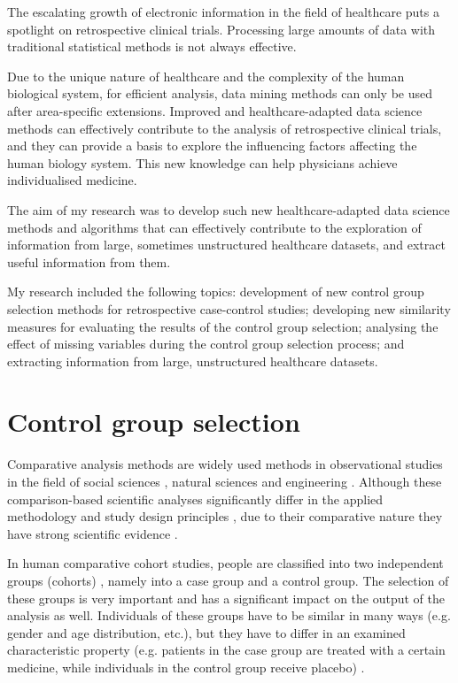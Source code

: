The escalating growth of electronic information in the field of healthcare puts a spotlight on retrospective clinical trials. Processing large amounts of data with traditional statistical methods is not always effective.


Due to the unique nature of healthcare and the complexity of the human biological system, for efficient analysis, data mining methods can only be used after area-specific extensions. Improved and healthcare-adapted data science methods can effectively contribute to the analysis of retrospective clinical trials, and they can provide a basis to explore the influencing factors affecting the human biology system. This new knowledge can help physicians achieve individualised medicine.

The aim of my research was to develop such new healthcare-adapted data science methods and algorithms that can effectively contribute to the exploration of information from large, sometimes unstructured healthcare datasets, and extract useful information from them.

My research included the following topics: development of new control group selection methods for retrospective case-control studies; developing new similarity measures for evaluating the results of the control group selection; analysing the effect of missing variables during the control group selection process; and extracting information from large, unstructured healthcare datasets.

\section{Control group selection}
\label{sec:cgs_intro}

Comparative analysis methods are widely used methods in observational studies in the field of social sciences \cite{rasoolimanesh2023guideline}, natural sciences \cite{zeng2023comparative} and engineering \cite{abualigah2022meta}. Although these comparison-based scientific analyses significantly differ in the applied methodology and study design principles \cite{song2010observational, wacholder1992selection3}, due to their comparative nature they have strong scientific evidence \cite{horton2011encyclopaedic, zschoch2011configurational, pickvance2005four, wacholder1992selection,wacholder1992selection2}.

In human comparative cohort studies, people are classified into two independent groups (cohorts) \cite{wacholder1992selection}, namely into a case group and a control group. The selection of these groups is very important and has a significant impact on the output of the analysis as well. Individuals of these groups have to be similar in many ways (e.g. gender and age distribution, etc.), but they have to differ in an examined characteristic property (e.g. patients in the case group are treated with a certain medicine, while individuals in the control group receive placebo) \cite{wacholder1992selection, wacholder1992selection2, iwagami2022introduction}.

